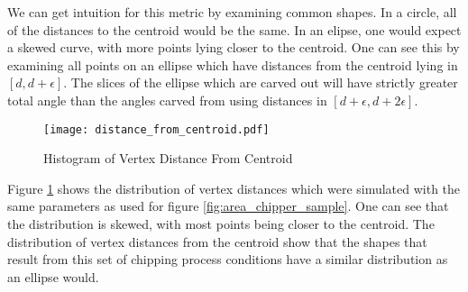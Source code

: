 We can get intuition for this metric by examining common shapes. In a circle, all of the distances to the centroid would be the same. In an elipse, one would expect a skewed curve, with more points lying closer to the centroid. One can see this by examining all points on an ellipse which have distances from the centroid lying in $[d, d + \epsilon]$. The slices of the ellipse which are carved out will have strictly greater total angle than the angles carved from using distances in $[d + \epsilon, d + 2 \epsilon]$.

\begin{figure}
  \begin{center}
    \texttt{[image: distance\_from\_centroid.pdf]}
  \end{center}
  \caption{Histogram of Vertex Distance From Centroid \label{fig:distance_from_centroid}}
\end{figure}

Figure \ref{fig:distance_from_centroid} shows the distribution of vertex distances which were simulated with the same parameters as used for figure \ref{fig:area_chipper_sample}. One can see that the distribution is skewed, with most points being closer to the centroid. The distribution of vertex distances from the centroid show that the shapes that result from this set of chipping process conditions have a similar distribution as an ellipse would.
